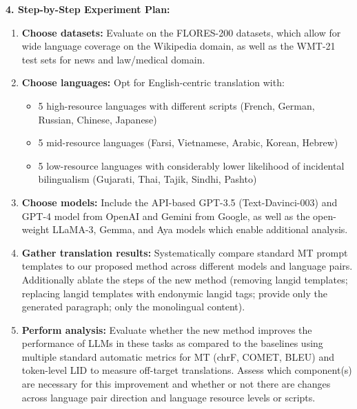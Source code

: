 \begin{tcolorbox}[colback=blue!5!white,colframe=blue!75!black,title=\textbf{Translation with LLMs through Prompting with Long-Form Context (Part 1)}]
    \textbf{4. Step-by-Step Experiment Plan:}
    \begin{enumerate}
        \item \textbf{Choose datasets:} Evaluate on the FLORES-200 datasets, which allow for wide language coverage on the Wikipedia domain, as well as the WMT-21 test sets for news and law/medical domain.
        \item \textbf{Choose languages:} Opt for English-centric translation with:
            \begin{itemize}
                \item 5 high-resource languages with different scripts (French, German, Russian, Chinese, Japanese)
                \item 5 mid-resource languages (Farsi, Vietnamese, Arabic, Korean, Hebrew)
                \item 5 low-resource languages with considerably lower likelihood of incidental bilingualism (Gujarati, Thai, Tajik, Sindhi, Pashto)
            \end{itemize}
        \item \textbf{Choose models:} Include the API-based GPT-3.5 (Text-Davinci-003) and GPT-4 model from OpenAI and Gemini from Google, as well as the open-weight LLaMA-3, Gemma, and Aya models which enable additional analysis.
        \item \textbf{Gather translation results:} Systematically compare standard MT prompt templates to our proposed method across different models and language pairs. Additionally ablate the steps of the new method (removing langid templates; replacing langid templates with endonymic langid tags; provide only the generated paragraph; only the monolingual content).
        \item \textbf{Perform analysis:} Evaluate whether the new method improves the performance of LLMs in these tasks as compared to the baselines using multiple standard automatic metrics for MT (chrF, COMET, BLEU) and token-level LID to measure off-target translations. Assess which component(s) are necessary for this improvement and whether or not there are changes across language pair direction and language resource levels or scripts.
    \end{enumerate}

\end{tcolorbox}

\newpage 

